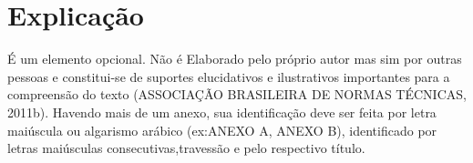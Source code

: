 \chapter{Explicação}
\label{anexo: a}

É um elemento opcional. Não é Elaborado pelo próprio autor mas sim por outras pessoas e constitui-se de suportes elucidativos e ilustrativos importantes para a compreensão do texto (ASSOCIAÇÃO BRASILEIRA DE NORMAS TÉCNICAS, 2011b). Havendo mais de um anexo, sua identificação deve ser feita por letra maiúscula ou algarismo arábico (ex:ANEXO A, ANEXO B), identificado por letras maiúsculas consecutivas,travessão e pelo respectivo título. 
